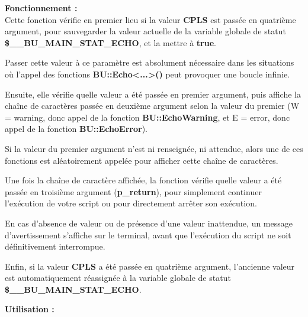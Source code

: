 \documentclass[a4paper,10pt]{article}
\begin{document}
\begin{justify}
    \textbf{Fonctionnement :}\\
    Cette fonction vérifie en premier lieu si la valeur \textbf{CPLS} est passée en quatrième argument, pour sauvegarder la valeur actuelle de la variable globale de statut \textbf{\color{orange}\$\_\_BU\_MAIN\_STAT\_ECHO}, et la mettre à \textbf{true}.
\end{justify}

\begin{justify}
    Passer cette valeur à ce paramètre est absolument nécessaire dans les situations où l'appel des fonctions \textbf{\color{mauve}BU::Echo<...>()} peut provoquer une boucle infinie.
\end{justify}

\begin{justify}    
    Ensuite, elle vérifie quelle valeur a été passée en premier argument, puis affiche la chaîne de caractères passée en deuxième argument selon la valeur du premier (W = warning, donc appel de la fonction \textbf{\color{mauve}BU::EchoWarning}, et E = error, donc appel de la fonction \textbf{\color{mauve}BU::EchoError}).
\end{justify}

\begin{justify}
    Si la valeur du premier argument n'est ni renseignée, ni attendue, alors une de ces fonctions est aléatoirement appelée pour afficher cette chaîne de caractères.
\end{justify}

\begin{justify}
    Une fois la chaîne de caractère affichée, la fonction vérifie quelle valeur a été passée en troisième argument (\textbf{\color{orange}p\_return}), pour simplement continuer l'exécution de votre script ou pour directement arrêter son exécution.
\end{justify}

\begin{justify}
    En cas d'absence de valeur ou de présence d'une valeur inattendue, un message d'avertissement s'affiche sur le terminal, avant que l'exécution du script ne soit définitivement interrompue.
\end{justify}

\begin{justify}
    Enfin, si la valeur \textbf{CPLS} a été passée en quatrième argument, l'ancienne valeur est automatiquement réassignée à la variable globale de statut \textbf{\color{orange}\$\_\_BU\_MAIN\_STAT\_ECHO}.
\end{justify}

\begin{justify}
    \textbf{Utilisation :}
\end{justify}
\end{document}
